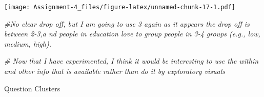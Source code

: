 \documentclass[
]{article}
\newenvironment{Shaded}{\begin{snugshade}}{\end{snugshade}}
\newcommand{\CommentTok}[1]{\textcolor[rgb]{0.56,0.35,0.01}{\textit{#1}}}
\newcommand{\DataTypeTok}[1]{\textcolor[rgb]{0.13,0.29,0.53}{#1}}
\newcommand{\DecValTok}[1]{\textcolor[rgb]{0.00,0.00,0.81}{#1}}
\newcommand{\KeywordTok}[1]{\textcolor[rgb]{0.13,0.29,0.53}{\textbf{#1}}}
\newcommand{\NormalTok}[1]{#1}
\newcommand{\OperatorTok}[1]{\textcolor[rgb]{0.81,0.36,0.00}{\textbf{#1}}}
\newcommand{\StringTok}[1]{\textcolor[rgb]{0.31,0.60,0.02}{#1}}
\begin{document}
\begin{Shaded}
\end{Shaded}

\texttt{[image: Assignment-4\_files/figure-latex/unnamed-chunk-17-1.pdf]}

\begin{Shaded}
\begin{Highlighting}[]
\CommentTok{#No clear drop off, but I am going to use 3 again as it appears the drop off is between 2-3,a nd people in education love to group people in 3-4 groups (e.g., low, medium, high).}

\CommentTok{# Now that I have experimented, I think it would be interesting to use the within and other info that is available rather than do it by exploratory visuals}
\end{Highlighting}
\end{Shaded}

Question Clusters

\begin{Shaded}
\end{Shaded}
\end{document}

